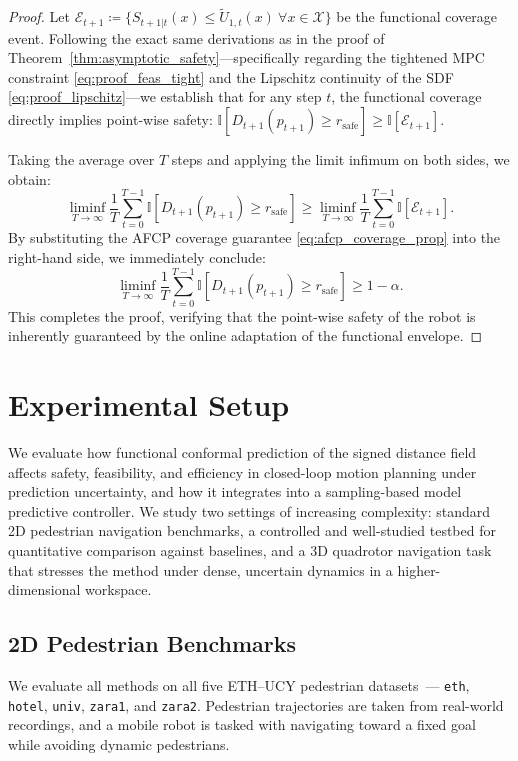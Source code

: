 \documentclass[lettersize,journal]{IEEEtran}
\begin{document}
\begin{proof}
Let $\mathcal E_{t+1} \coloneqq \{ S_{t+1|t}(x)\le \widetilde U_{1,t}(x)\ \forall x\in\mathcal X \}$ be the functional coverage event.
Following the exact same derivations as in the proof of Theorem~\ref{thm:asymptotic_safety}—specifically regarding the tightened MPC constraint \eqref{eq:proof_feas_tight} and the Lipschitz continuity of the SDF \eqref{eq:proof_lipschitz}—we establish that for any step $t$, the functional coverage directly implies point-wise safety:
$\mathbb I\!\left[D_{t+1}(p_{t+1})\ge r_{\mathrm{safe}}\right] \ge \mathbb I[\mathcal E_{t+1}]$.

Taking the average over $T$ steps and applying the limit infimum on both sides, we obtain:
\[
\liminf_{T\to\infty} \frac{1}{T}\sum_{t=0}^{T-1} \mathbb I\!\left[D_{t+1}(p_{t+1})\ge r_{\mathrm{safe}}\right] \ge \liminf_{T\to\infty} \frac{1}{T}\sum_{t=0}^{T-1}\mathbb I[\mathcal E_{t+1}].
\]
By substituting the AFCP coverage guarantee \eqref{eq:afcp_coverage_prop} into the right-hand side, we immediately conclude:
\[
\liminf_{T\to\infty} \frac{1}{T}\sum_{t=0}^{T-1} \mathbb I\!\left[D_{t+1}(p_{t+1})\ge r_{\mathrm{safe}}\right] \ge 1-\alpha.
\]
This completes the proof, verifying that the point-wise safety of the robot is inherently guaranteed by the online adaptation of the functional envelope.
\end{proof}



\section{Experimental Setup}
We evaluate how functional conformal prediction of the signed distance field affects
safety, feasibility, and efficiency in closed-loop motion planning under prediction
uncertainty, and how it integrates into a sampling-based model predictive controller.
We study two settings of increasing complexity: standard 2D pedestrian navigation
benchmarks, a controlled and well-studied testbed for quantitative comparison against
baselines, and a 3D quadrotor navigation task that stresses the method under dense,
uncertain dynamics in a higher-dimensional workspace.

\subsection{2D Pedestrian Benchmarks}
We evaluate all methods on all five ETH--UCY pedestrian datasets~\cite{pellegrini2009you,lerner2007crowds}---
\texttt{eth}, \texttt{hotel}, \texttt{univ}, \texttt{zara1}, and \texttt{zara2}.
Pedestrian trajectories are taken from real-world recordings, and a mobile robot
is tasked with navigating toward a fixed goal while avoiding dynamic pedestrians.
\end{document}
